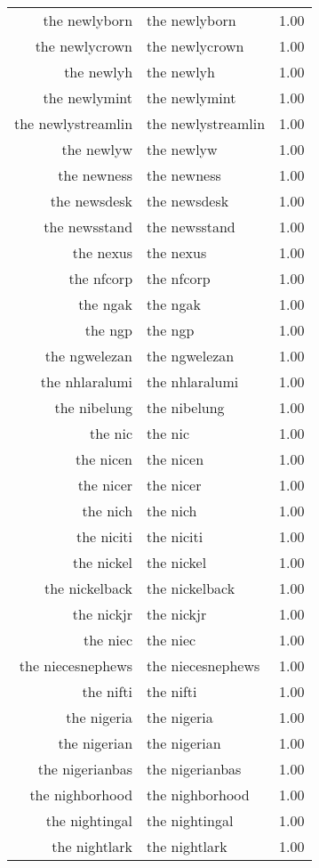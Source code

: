 \begin{table}[ht]
\begin{tabular}{rlr}
  the newlyborn & the newlyborn & 1.00 \\ 
  the newlycrown & the newlycrown & 1.00 \\ 
  the newlyh & the newlyh & 1.00 \\ 
  the newlymint & the newlymint & 1.00 \\ 
  the newlystreamlin & the newlystreamlin & 1.00 \\ 
  the newlyw & the newlyw & 1.00 \\ 
  the newness & the newness & 1.00 \\ 
  the newsdesk & the newsdesk & 1.00 \\ 
  the newsstand & the newsstand & 1.00 \\ 
  the nexus & the nexus & 1.00 \\ 
  the nfcorp & the nfcorp & 1.00 \\ 
  the ngak & the ngak & 1.00 \\ 
  the ngp & the ngp & 1.00 \\ 
  the ngwelezan & the ngwelezan & 1.00 \\ 
  the nhlaralumi & the nhlaralumi & 1.00 \\ 
  the nibelung & the nibelung & 1.00 \\ 
  the nic & the nic & 1.00 \\ 
  the nicen & the nicen & 1.00 \\ 
  the nicer & the nicer & 1.00 \\ 
  the nich & the nich & 1.00 \\ 
  the niciti & the niciti & 1.00 \\ 
  the nickel & the nickel & 1.00 \\ 
  the nickelback & the nickelback & 1.00 \\ 
  the nickjr & the nickjr & 1.00 \\ 
  the niec & the niec & 1.00 \\ 
  the niecesnephews & the niecesnephews & 1.00 \\ 
  the nifti & the nifti & 1.00 \\ 
  the nigeria & the nigeria & 1.00 \\ 
  the nigerian & the nigerian & 1.00 \\ 
  the nigerianbas & the nigerianbas & 1.00 \\ 
  the nighborhood & the nighborhood & 1.00 \\ 
  the nightingal & the nightingal & 1.00 \\ 
  the nightlark & the nightlark & 1.00 \\ 

\end{tabular}
\end{table}
